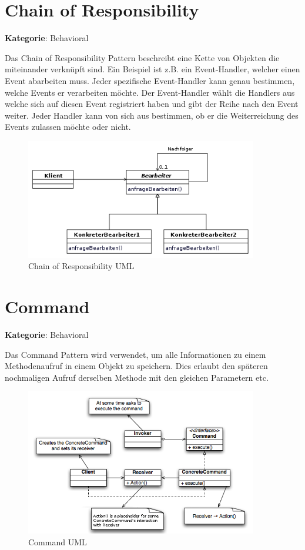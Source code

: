 \section{Chain of Responsibility}
\textbf{Kategorie}: Behavioral

Das Chain of Responsibility Pattern beschreibt eine Kette von Objekten die miteinander verknüpft sind. Ein Beispiel ist z.B. ein Event-Handler, welcher einen Event abarbeiten muss. Jeder spezifische Event-Handler kann genau bestimmen, welche Events er verarbeiten möchte. Der Event-Handler wählt die Handlers aus welche sich auf diesen Event registriert haben und gibt der Reihe nach den Event weiter. Jeder Handler kann von sich aus bestimmen, ob er die Weiterreichung des Events zulassen möchte oder nicht.

\begin{figure}[H]
	\centering
	\includegraphics[width=0.9\textwidth]{content/gof/images/12-chain-of-responsibility-uml.png}
	\caption{Chain of Responsibility UML}
\end{figure}


\section{Command}
\textbf{Kategorie}: Behavioral

Das Command Pattern wird verwendet, um alle Informationen zu einem Methodenaufruf in einem Objekt zu speichern. Dies erlaubt den späteren nochmaligen Aufruf derselben Methode mit den gleichen Parametern etc.

\begin{figure}[H]
	\centering
	\includegraphics[width=0.9\textwidth]{content/gof/images/13-command-uml.png}
	\caption{Command UML}
\end{figure}


